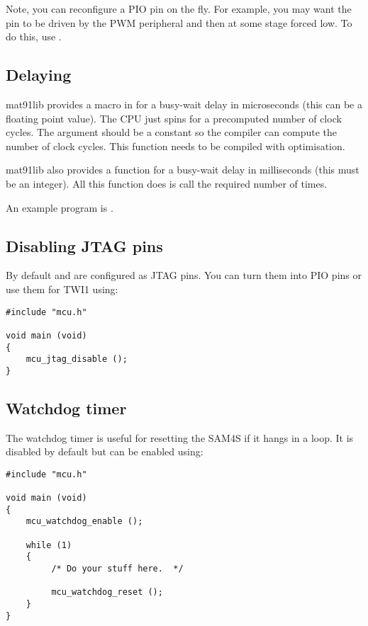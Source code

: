 Note, you can reconfigure a PIO pin on the fly.  For example, you may
want the pin to be driven by the PWM peripheral and then at some stage
forced low.  To do this, use .


\subsection{Delaying}

mat91lib provides a macro  in
 for a busy-wait delay in microseconds
(this can be a floating point value).  The CPU just spins for a
precomputed number of clock cycles.  The argument should be a constant
so the compiler can compute the number of clock cycles.  This function
needs to be compiled with optimisation.

mat91lib also provides a function  for a busy-wait
delay in milliseconds (this must be an integer).  All this function
does is call  the required number of times.

An example program is .


\subsection{Disabling JTAG pins}
\label{disabling-jtag-pins}

By default  and  are configured as JTAG pins. You can turn
them into PIO pins or use them for TWI1 using:
%
\begin{verbatim}
#include "mcu.h"

void main (void)
{
    mcu_jtag_disable ();
}
\end{verbatim}


\subsection{Watchdog timer}
\label{watchdog-timer}

The watchdog timer is useful for resetting the SAM4S if it hangs in a
loop.  It is disabled by default but can be enabled using:
%
\begin{verbatim}
#include "mcu.h"

void main (void)
{
    mcu_watchdog_enable ();
   
    while (1)
    {
         /* Do your stuff here.  */

         mcu_watchdog_reset ();
    }
}
\end{verbatim}


